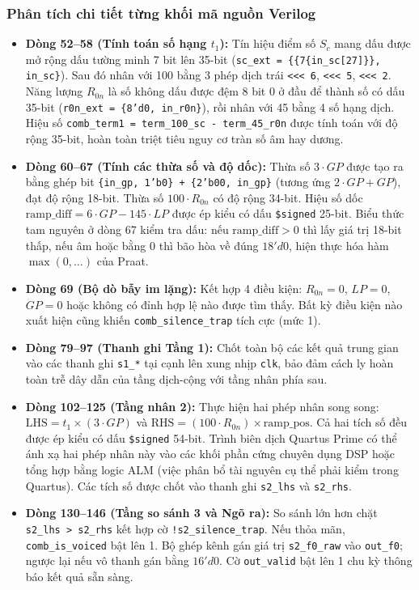 \subsubsection*{Phân tích chi tiết từng khối mã nguồn Verilog}
\begin{itemize}
    \item \textbf{Dòng 52--58 (Tính toán số hạng $t_1$):} Tín hiệu điểm số $S_c$ mang dấu được mở rộng dấu tường minh 7 bit lên 35-bit (\texttt{sc\_ext = \{\{7\{in\_sc[27]\}\}, in\_sc\}}). Sau đó nhân với 100 bằng 3 phép dịch trái \texttt{<<< 6}, \texttt{<<< 5}, \texttt{<<< 2}. Năng lượng $R_{0n}$ là số không dấu được đệm 8 bit 0 ở đầu để thành số có dấu 35-bit (\texttt{r0n\_ext = \{8'd0, in\_r0n\}}), rồi nhân với 45 bằng 4 số hạng dịch. Hiệu số \texttt{comb\_term1 = term\_100\_sc - term\_45\_r0n} được tính toán với độ rộng 35-bit, hoàn toàn triệt tiêu nguy cơ tràn số âm hay dương.
    \item \textbf{Dòng 60--67 (Tính các thừa số và độ dốc):} Thừa số $3 \cdot GP$ được tạo ra bằng ghép bit \texttt{\{in\_gp, 1'b0\} + \{2'b00, in\_gp\}} (tương ứng $2\cdot GP + GP$), đạt độ rộng 18-bit. Thừa số $100 \cdot R_{0n}$ có độ rộng 34-bit. Hiệu số dốc $\text{ramp\_diff} = 6 \cdot GP - 145 \cdot LP$ được ép kiểu có dấu \texttt{\$signed} 25-bit. Biểu thức tam nguyên ở dòng 67 kiểm tra dấu: nếu $\text{ramp\_diff} > 0$ thì lấy giá trị 18-bit thấp, nếu âm hoặc bằng 0 thì bão hòa về đúng $18'd0$, hiện thực hóa hàm $\max(0, \dots)$ của Praat.
    \item \textbf{Dòng 69 (Bộ dò bẫy im lặng):} Kết hợp 4 điều kiện: $R_{0n} = 0$, $LP = 0$, $GP = 0$ hoặc không có đỉnh hợp lệ nào được tìm thấy. Bất kỳ điều kiện nào xuất hiện cũng khiến \texttt{comb\_silence\_trap} tích cực (mức 1).
    \item \textbf{Dòng 79--97 (Thanh ghi Tầng 1):} Chốt toàn bộ các kết quả trung gian vào các thanh ghi \texttt{s1\_*} tại cạnh lên xung nhịp \texttt{clk}, bảo đảm cách ly hoàn toàn trễ dây dẫn của tầng dịch-cộng với tầng nhân phía sau.
    \item \textbf{Dòng 102--125 (Tầng nhân 2):} Thực hiện hai phép nhân song song: $\text{LHS} = t_1 \times (3\cdot GP)$ và $\text{RHS} = (100\cdot R_{0n}) \times \text{ramp\_pos}$. Cả hai tích số đều được ép kiểu có dấu \texttt{\$signed} 54-bit. Trình biên dịch Quartus Prime có thể ánh xạ hai phép nhân này vào các khối phần cứng chuyên dụng DSP hoặc tổng hợp bằng logic ALM (việc phân bổ tài nguyên cụ thể phải kiểm trong Quartus). Các tích số được chốt vào thanh ghi \texttt{s2\_lhs} và \texttt{s2\_rhs}.
    \item \textbf{Dòng 130--146 (Tầng so sánh 3 và Ngõ ra):} So sánh lớn hơn chặt \texttt{s2\_lhs > s2\_rhs} kết hợp cờ \texttt{!s2\_silence\_trap}. Nếu thỏa mãn, \texttt{comb\_is\_voiced} bật lên 1. Bộ ghép kênh gán giá trị \texttt{s2\_f0\_raw} vào \texttt{out\_f0}; ngược lại nếu vô thanh gán bằng $16'd0$. Cờ \texttt{out\_valid} bật lên 1 chu kỳ thông báo kết quả sẵn sàng.
\end{itemize}

